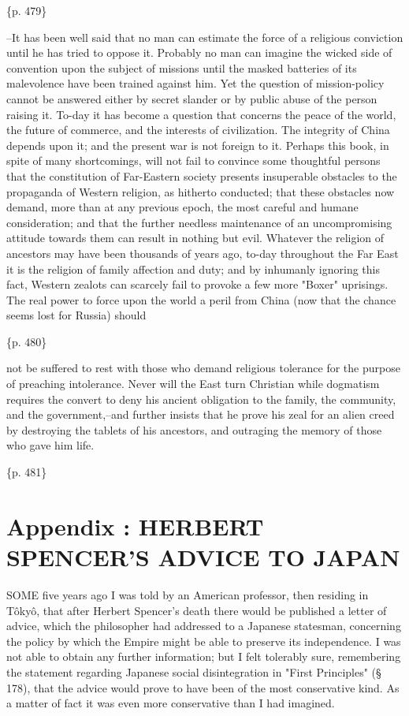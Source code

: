\{p. 479\}

--It has been well said that no man can estimate the force of a religious conviction until he has tried to oppose it. Probably no man can imagine the wicked side of convention upon the subject of missions until the masked batteries of its malevolence have been trained against him. Yet the question of mission-policy cannot be answered either by secret slander or by public abuse of the person raising it. To-day it has become a question that concerns the peace of the world, the future of commerce, and the interests of civilization. The integrity of China depends upon it; and the present war is not foreign to it. Perhaps this book, in spite of many shortcomings, will not fail to convince some thoughtful persons that the constitution of Far-Eastern society presents insuperable obstacles to the propaganda of Western religion, as hitherto conducted; that these obstacles now demand, more than at any previous epoch, the most careful and humane consideration; and that the further needless maintenance of an uncompromising attitude towards them can result in nothing but evil. Whatever the religion of ancestors may have been thousands of years ago, to-day throughout the Far East it is the religion of family affection and duty; and by inhumanly ignoring this fact, Western zealots can scarcely fail to provoke a few more "Boxer" uprisings. The real power to force upon the world a peril from China (now that the chance seems lost for Russia) should

\{p. 480\}

not be suffered to rest with those who demand religious tolerance for the purpose of preaching intolerance. Never will the East turn Christian while dogmatism requires the convert to deny his ancient obligation to the family, the community, and the government,--and further insists that he prove his zeal for an alien creed by destroying the tablets of his ancestors, and outraging the memory of those who gave him life.

\{p. 481\}

\section{Appendix :  HERBERT SPENCER'S ADVICE TO JAPAN}
\label{sec:org21398c9}

SOME five years ago I was told by an American professor, then residing in Tôkyô, that after Herbert Spencer's death there would be published a letter of advice, which the philosopher had addressed to a Japanese statesman, concerning the policy by which the Empire might be able to preserve its independence. I was not able to obtain any further information; but I felt tolerably sure, remembering the statement regarding Japanese social disintegration in "First Principles" (§ 178), that the advice would prove to have been of the most conservative kind. As a matter of fact it was even more conservative than I had imagined.

